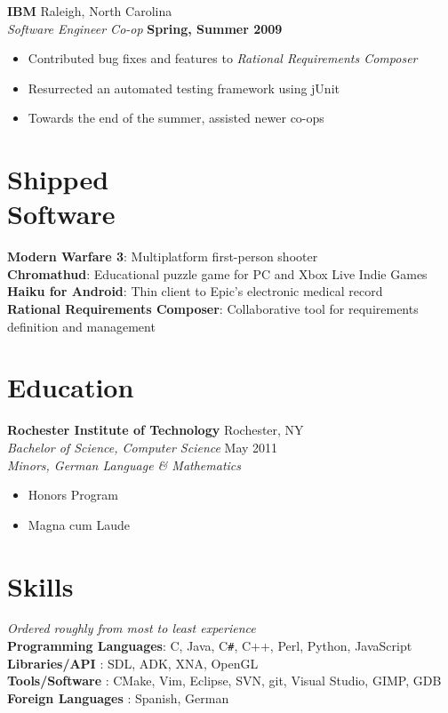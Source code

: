 \documentclass[line,margin]{res}
\newcommand{\CS}{C\texttt{\#}}
\begin{document}
\begin{resume}
    \textbf{IBM} \hfill Raleigh, North Carolina  \\
    \textit{Software Engineer Co-op} \hfill \textbf{Spring, Summer 2009}
    \vspace{0.05in}
    \begin{itemize}
        \item Contributed bug fixes and features to \textit{Rational Requirements Composer}
        \item Resurrected an automated testing framework using jUnit
        \item Towards the end of the summer, assisted newer co-ops 
    \end{itemize}

\section{\sc Shipped \\ Software}
    \textbf{Modern Warfare 3}: Multiplatform first-person shooter \\
    \textbf{Chromathud}: Educational puzzle game for PC and Xbox Live Indie Games \\
    \textbf{Haiku for Android}: Thin client to Epic's electronic medical record  \\
    \textbf{Rational Requirements Composer}: Collaborative tool for requirements definition and management
 
\section{\sc Education}          
    \textbf{Rochester Institute of Technology}     \hfill  Rochester, NY  \\        
    \textit{Bachelor of Science, Computer Science} \hfill May 2011    \\
    \textit{Minors, German Language \& Mathematics} 
    \begin{itemize} \itemsep -4pt
        \item Honors Program 
        \item Magna cum Laude 
    \end{itemize}


\section{\sc Skills}          
    \textit{\small Ordered roughly from most to least experience}                           \\
    \textbf{Programming Languages}: C, Java, \CS, C++, Perl, Python, JavaScript             \\
    \textbf{Libraries/API        }: SDL, ADK, XNA, OpenGL                                   \\
    \textbf{Tools/Software       }: CMake, Vim, Eclipse, SVN, git, Visual Studio, GIMP, GDB \\
    \textbf{Foreign Languages    }: Spanish, German


\end{resume}
\end{document}
